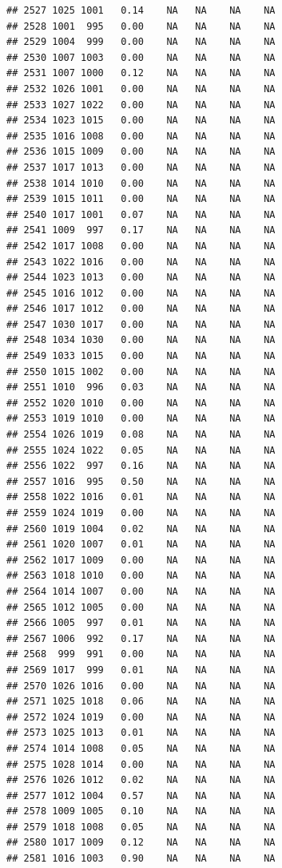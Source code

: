 \documentclass{article}\usepackage{graphicx, color}
\makeatletter
\newenvironment{kframe}{%
 \def\at@end@of@kframe{}%
 \ifinner\ifhmode%
  \def\at@end@of@kframe{\end{minipage}}%
  \begin{minipage}{\columnwidth}%
 \fi\fi%
 \def\FrameCommand##1{\hskip\@totalleftmargin \hskip-\fboxsep
 \colorbox{shadecolor}{##1}\hskip-\fboxsep
     \hskip-\linewidth \hskip-\@totalleftmargin \hskip\columnwidth}%
 \MakeFramed {\advance\hsize-\width
   \@totalleftmargin\z@ \linewidth\hsize
   \@setminipage}}%
 {\par\unskip\endMakeFramed%
 \at@end@of@kframe}
\newenvironment{knitrout}{}{} %
\makeatother
\begin{document}
\begin{knitrout}
\begin{kframe}
\begin{verbatim}
## 2527 1025 1001   0.14    NA   NA    NA    NA
## 2528 1001  995   0.00    NA   NA    NA    NA
## 2529 1004  999   0.00    NA   NA    NA    NA
## 2530 1007 1003   0.00    NA   NA    NA    NA
## 2531 1007 1000   0.12    NA   NA    NA    NA
## 2532 1026 1001   0.00    NA   NA    NA    NA
## 2533 1027 1022   0.00    NA   NA    NA    NA
## 2534 1023 1015   0.00    NA   NA    NA    NA
## 2535 1016 1008   0.00    NA   NA    NA    NA
## 2536 1015 1009   0.00    NA   NA    NA    NA
## 2537 1017 1013   0.00    NA   NA    NA    NA
## 2538 1014 1010   0.00    NA   NA    NA    NA
## 2539 1015 1011   0.00    NA   NA    NA    NA
## 2540 1017 1001   0.07    NA   NA    NA    NA
## 2541 1009  997   0.17    NA   NA    NA    NA
## 2542 1017 1008   0.00    NA   NA    NA    NA
## 2543 1022 1016   0.00    NA   NA    NA    NA
## 2544 1023 1013   0.00    NA   NA    NA    NA
## 2545 1016 1012   0.00    NA   NA    NA    NA
## 2546 1017 1012   0.00    NA   NA    NA    NA
## 2547 1030 1017   0.00    NA   NA    NA    NA
## 2548 1034 1030   0.00    NA   NA    NA    NA
## 2549 1033 1015   0.00    NA   NA    NA    NA
## 2550 1015 1002   0.00    NA   NA    NA    NA
## 2551 1010  996   0.03    NA   NA    NA    NA
## 2552 1020 1010   0.00    NA   NA    NA    NA
## 2553 1019 1010   0.00    NA   NA    NA    NA
## 2554 1026 1019   0.08    NA   NA    NA    NA
## 2555 1024 1022   0.05    NA   NA    NA    NA
## 2556 1022  997   0.16    NA   NA    NA    NA
## 2557 1016  995   0.50    NA   NA    NA    NA
## 2558 1022 1016   0.01    NA   NA    NA    NA
## 2559 1024 1019   0.00    NA   NA    NA    NA
## 2560 1019 1004   0.02    NA   NA    NA    NA
## 2561 1020 1007   0.01    NA   NA    NA    NA
## 2562 1017 1009   0.00    NA   NA    NA    NA
## 2563 1018 1010   0.00    NA   NA    NA    NA
## 2564 1014 1007   0.00    NA   NA    NA    NA
## 2565 1012 1005   0.00    NA   NA    NA    NA
## 2566 1005  997   0.01    NA   NA    NA    NA
## 2567 1006  992   0.17    NA   NA    NA    NA
## 2568  999  991   0.00    NA   NA    NA    NA
## 2569 1017  999   0.01    NA   NA    NA    NA
## 2570 1026 1016   0.00    NA   NA    NA    NA
## 2571 1025 1018   0.06    NA   NA    NA    NA
## 2572 1024 1019   0.00    NA   NA    NA    NA
## 2573 1025 1013   0.01    NA   NA    NA    NA
## 2574 1014 1008   0.05    NA   NA    NA    NA
## 2575 1028 1014   0.00    NA   NA    NA    NA
## 2576 1026 1012   0.02    NA   NA    NA    NA
## 2577 1012 1004   0.57    NA   NA    NA    NA
## 2578 1009 1005   0.10    NA   NA    NA    NA
## 2579 1018 1008   0.05    NA   NA    NA    NA
## 2580 1017 1009   0.12    NA   NA    NA    NA
## 2581 1016 1003   0.90    NA   NA    NA    NA

\end{verbatim}
\end{kframe}
\end{knitrout}
\end{document}
